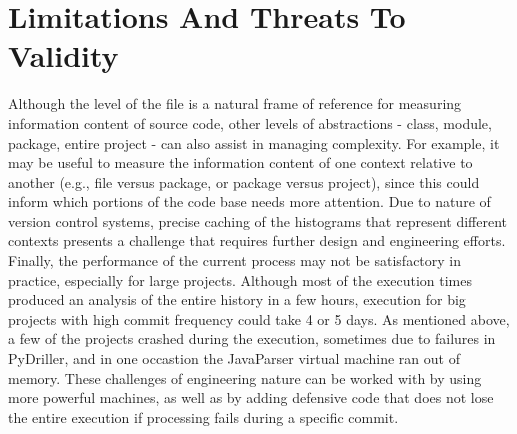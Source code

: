 \documentclass[10pt,conference]{IEEEtran}
\begin{document}
\section{Limitations And Threats To Validity}
 Although the level of the file is a natural frame of reference for measuring information content of source code, other levels of abstractions - class, module, package, entire project - can also assist in managing complexity. For example, it may be useful to measure the information content of one context relative to another (e.g., file versus package, or package versus project), since this could inform which portions of the code base needs more attention.
 Due to nature of version control systems, precise caching of the histograms that represent different contexts presents a challenge that requires further design and engineering efforts. Finally, the performance of the current process may not be satisfactory in practice, especially for large projects. Although most of the execution times produced an analysis of the entire history in a few hours, execution for big projects with high commit frequency could take 4 or 5 days. As mentioned above, a few of the projects crashed during the execution, sometimes due to failures in PyDriller, and in one occastion the JavaParser virtual machine ran out of memory. These challenges of engineering nature can be worked with by using more powerful machines, as well as by adding defensive code that does not lose the entire execution if processing fails during a specific commit.
\end{document}
